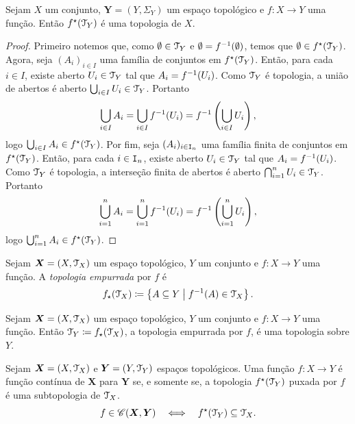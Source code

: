 \begin{prop}
Sejam $X$ um conjunto, $\bm Y = (Y,\Sigma_Y)$ um espaço topológico e $f: X \to Y$ uma função. Então $f^\star(\mathcal{T}_Y)$ é uma topologia de $X$.
\end{prop}
\begin{proof}
Primeiro notemos que, como $\emptyset \in \mathcal{T}_Y$ e $\emptyset = f^{-1}(\emptyset)$, temos que $\emptyset \in f^\star(\mathcal{T}_Y)$. Agora, seja $(A_i)_{i \in I}$ uma família de conjuntos em $f^\star(\mathcal{T}_Y)$. Então, para cada $i \in I$, existe aberto $U_i \in \mathcal{T}_Y$ tal que $A_i=f^{-1}(U_i)$. Como $\mathcal{T}_Y$ é topologia, a união de abertos é aberto $\bigcup_{i \in I} U_i \in \mathcal{T}_Y$. Portanto
	\begin{equation*}
	\bigcup_{i \in I} A_i = \bigcup_{i \in I} f^{-1}(U_i) = f^{-1}\left( \bigcup_{i \in I} U_i\right),
	\end{equation*}
logo $\bigcup_{i \in I} A_i \in f^\star(\mathcal{T}_Y)$.
Por fim, seja $(A_i)_{i \in \mathtt I_n}$ uma família finita de conjuntos em $f^\star(\mathcal{T}_Y)$. Então, para cada $i \in \mathtt I_n$, existe aberto $U_i \in \mathcal{T}_Y$ tal que $A_i=f^{-1}(U_i)$. Como $\mathcal{T}_Y$ é topologia, a interseção finita de abertos é aberto $\bigcap_{i=1}^n U_i \in \mathcal{T}_Y$. Portanto
	\begin{equation*}
	\bigcup_{i=1}^n A_i = \bigcup_{i=1}^n f^{-1}(U_i) = f^{-1}\left( \bigcup_{i=1}^n U_i\right),
	\end{equation*}
logo $\bigcup_{i=1}^n A_i \in f^\star(\mathcal{T}_Y)$.
\end{proof}

\begin{defi}
Sejam $\bm X = (X,\mathcal{T}_X)$ um espaço topológico, $Y$ um conjunto e $f: X \to Y$ uma função. A \emph{topologia empurrada} por $f$ é
	\begin{equation*}
	f_\star(\topo_X) \coloneqq \set{A \subseteq Y}{f^{-1}(A) \in \topo_X}.
	\end{equation*}
\end{defi}

\begin{prop}
Sejam $\bm X = (X,\mathcal{T}_X)$ um espaço topológico, $Y$ um conjunto e $f: X \to Y$ uma função. Então $\topo_Y \coloneqq f_\star(\topo_X)$, a topologia empurrada por $f$, é uma topologia sobre $Y$.
\end{prop}


\begin{prop}
Sejam $\bm X = (X,\mathcal{T}_ X)$ e $\bm Y = (Y,\mathcal{T}_ Y)$ espaços topológicos. Uma função $f: X \to Y$ é função contínua de $\bm X$ para $\bm Y$ se, e somente se, a topologia $f^\star(\mathcal{T}_Y)$ puxada por $f$ é uma subtopologia de $\mathcal{T}_ X$.
	\begin{equation*}
	f \in \mathscr{C}(\bm X,\bm Y) \quad \Longleftrightarrow \quad f^\star(\mathcal{T}_Y) \subseteq \mathcal{T}_X.
	\end{equation*}
\end{prop}


